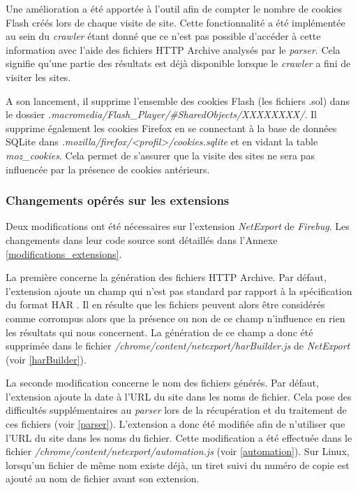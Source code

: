 Une amélioration a été apportée à l'outil afin de compter le nombre de cookies Flash créés lors de chaque visite de site. Cette fonctionnalité a été implémentée au sein du \textit{crawler} étant donné que ce n'est pas possible d'accéder à cette information avec l'aide des fichiers HTTP Archive analysés par le \textit{parser}. Cela signifie qu'une partie des résultats est déjà disponible lorsque le \textit{crawler} a fini de visiter les sites.

A son lancement, il supprime l'ensemble des cookies Flash (les fichiers .sol) dans le dossier \textit{.macromedia/Flash\_Player/\#SharedObjects/XXXXXXXX/}. Il supprime également les cookies Firefox en se connectant à la base de données SQLite dans \textit{.mozilla/firefox/<profil>/cookies.sqlite} et en vidant la table \textit{moz\_cookies}. Cela permet de s'assurer que la visite des sites ne sera pas influencée par la présence de cookies antérieurs.

\subsubsection{Changements opérés sur les extensions}
\label{changements_extensions}
Deux modifications ont été nécessaires sur l'extension \textit{NetExport} de \textit{Firebug}. Les changements dans leur code source sont détaillés dans l'Annexe \ref{modifications_extensions}.

La première concerne la génération des fichiers HTTP Archive. Par défaut, l'extension ajoute un champ qui n'est pas standard par rapport à la spécification du format HAR \cite{har_spec}. Il en résulte que les fichiers peuvent alors être considérés comme corrompus alors que la présence ou non de ce champ n'influence en rien les résultats qui nous concernent. La génération de ce champ a donc été supprimée dans le fichier \textit{/chrome/content/netexport/harBuilder.js} de \textit{NetExport} (voir \autoref{harBuilder}).

La seconde modification concerne le nom des fichiers générés. Par défaut, l'extension ajoute la date à l'URL du site dans les noms de fichier. Cela pose des difficultés supplémentaires au \textit{parser} lors de la récupération et du traitement de ces fichiers (voir \autoref{parser}). L'extension a donc été modifiée afin de n'utiliser que l'URL du site dans les noms du fichier. Cette modification a été effectuée dans le fichier \textit{/chrome/content/netexport/automation.js} (voir \autoref{automation}). Sur Linux, lorsqu'un fichier de même nom existe déjà, un tiret suivi du numéro de copie est ajouté au nom de fichier avant son extension.

